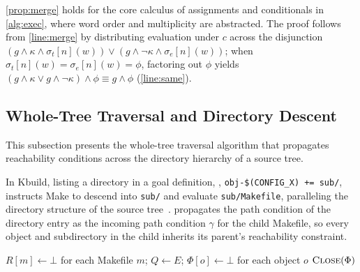 \documentclass[acmsmall,screen,review,anonymous,nonacm]{acmart}
\begin{document}
  \noindent
  \autoref{prop:merge} holds for the core calculus of assignments and conditionals in \autoref{alg:exec}, where word order and multiplicity are abstracted.
  The proof follows from \autoref{line:merge} by distributing evaluation under $c$ across the disjunction $(g \land \kappa \land \sigma_t[n](w)) \lor (g \land \neg\kappa \land \sigma_e[n](w))$; when $\sigma_t[n](w) = \sigma_e[n](w) = \phi$, factoring out $\phi$ yields $(g \land \kappa \lor g \land \neg\kappa) \land \phi \equiv g \land \phi$ (\autoref{line:same}).

  \subsection{Whole-Tree Traversal and Directory Descent}\label{sec:approach:dirs}
  This subsection presents the whole-tree traversal algorithm that propagates reachability conditions across the directory hierarchy of a source tree.

  In Kbuild, listing a directory in a goal definition, \eg, \texttt{obj-\$(CONFIG\_X) += sub/}, instructs Make to descend into \texttt{sub/} and evaluate \texttt{sub/Makefile}, paralleling the directory structure of the source tree~\cite{gazzillo2017kmax}.
  \tool{} propagates the path condition of the directory entry as the incoming path condition $\gamma$ for the child Makefile, so every object and subdirectory in the child inherits its parent's reachability constraint.

  \begin{algorithm}[t]
  \caption{Build conditions of the objects of a source tree}\label{alg:extract}
  $R[m] \gets \bot$ for each Makefile $m$; $Q \gets E$; $\Phi[o] \gets \bot$ for each object $o$\;
  \Return $\textsc{Close}(\Phi)$\label{line:close}
  \end{algorithm}
\end{document}
